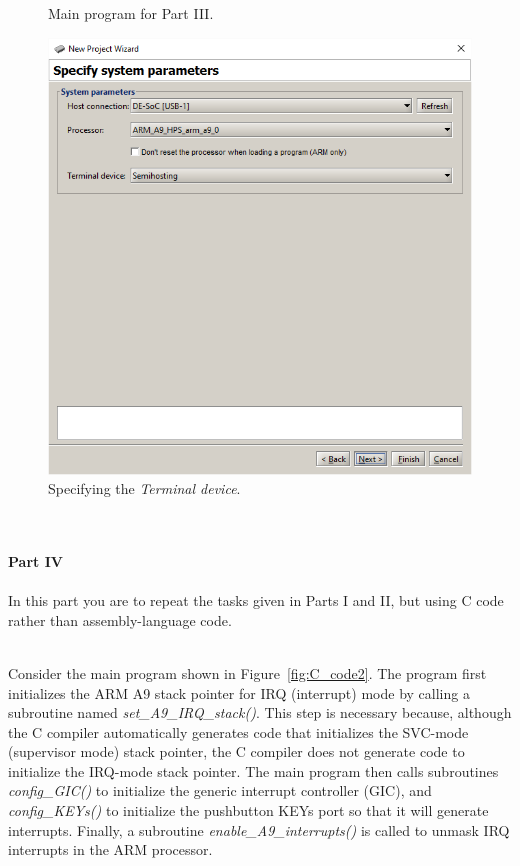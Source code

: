 \documentclass[epsfig,10pt,fullpage]{article}
\begin{document}
\begin{figure}[H]
\begin{center}

\end{center}
\caption{Main program for Part III.}
\label{fig:C_code1}
\end{figure}

\newpage
\begin{figure}[htb]
	\begin{center}
	\includegraphics[scale=0.58]{figures/figureMP_terminal.png}
	\end{center}
	\vspace{-0.25cm}\caption{Specifying the {\it Terminal device}.}
\label{fig:MPterminal}
\end{figure}

~\\
~\\
\noindent
{\bf Part IV}
~\\
~\\
\noindent
In this part you are to repeat the tasks given in Parts I and II, but using C code rather
than assembly-language code.

~\\
\noindent
Consider the main program shown in Figure~\ref{fig:C_code2}. The program first initializes the
ARM A9 stack pointer for IRQ (interrupt) mode by calling a subroutine named
{\it set\_A9\_IRQ\_stack()}. This step is necessary because, although
the C compiler automatically generates code that initializes the SVC-mode (supervisor mode)
stack pointer, the C compiler does not generate code to initialize the IRQ-mode stack pointer.
The main program then calls subroutines {\it config\_GIC()} to initialize the generic 
interrupt controller (GIC), and {\it config\_KEYs()} to initialize the pushbutton KEYs 
port so that it will generate interrupts. 
Finally, a subroutine {\it enable\_A9\_interrupts()} is called to unmask
IRQ interrupts in the ARM processor.
\end{document}
